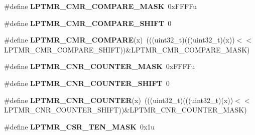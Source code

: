 \begin{DoxyCompactItemize}
\item 
\#define {\bfseries L\+P\+T\+M\+R\+\_\+\+C\+M\+R\+\_\+\+C\+O\+M\+P\+A\+R\+E\+\_\+\+M\+A\+SK}~0x\+F\+F\+F\+Fu\hypertarget{group__LPTMR__Register__Masks_ga55cc95c022500b353f1724f2cbfe7a8f}{}\label{group__LPTMR__Register__Masks_ga55cc95c022500b353f1724f2cbfe7a8f}

\item 
\#define {\bfseries L\+P\+T\+M\+R\+\_\+\+C\+M\+R\+\_\+\+C\+O\+M\+P\+A\+R\+E\+\_\+\+S\+H\+I\+FT}~0\hypertarget{group__LPTMR__Register__Masks_gae1a525e22dc8b9c6960ae2e859a64232}{}\label{group__LPTMR__Register__Masks_gae1a525e22dc8b9c6960ae2e859a64232}

\item 
\#define {\bfseries L\+P\+T\+M\+R\+\_\+\+C\+M\+R\+\_\+\+C\+O\+M\+P\+A\+RE}(x)~(((uint32\+\_\+t)(((uint32\+\_\+t)(x))$<$$<$L\+P\+T\+M\+R\+\_\+\+C\+M\+R\+\_\+\+C\+O\+M\+P\+A\+R\+E\+\_\+\+S\+H\+I\+FT))\&L\+P\+T\+M\+R\+\_\+\+C\+M\+R\+\_\+\+C\+O\+M\+P\+A\+R\+E\+\_\+\+M\+A\+SK)\hypertarget{group__LPTMR__Register__Masks_gad61ee0ea43ca3e503c2c16ed1b7b1696}{}\label{group__LPTMR__Register__Masks_gad61ee0ea43ca3e503c2c16ed1b7b1696}

\item 
\#define {\bfseries L\+P\+T\+M\+R\+\_\+\+C\+N\+R\+\_\+\+C\+O\+U\+N\+T\+E\+R\+\_\+\+M\+A\+SK}~0x\+F\+F\+F\+Fu\hypertarget{group__LPTMR__Register__Masks_ga134708aff0fe3bd31d703e32966c08fc}{}\label{group__LPTMR__Register__Masks_ga134708aff0fe3bd31d703e32966c08fc}

\item 
\#define {\bfseries L\+P\+T\+M\+R\+\_\+\+C\+N\+R\+\_\+\+C\+O\+U\+N\+T\+E\+R\+\_\+\+S\+H\+I\+FT}~0\hypertarget{group__LPTMR__Register__Masks_ga3769a974a3d95250e32bb154fa134c3f}{}\label{group__LPTMR__Register__Masks_ga3769a974a3d95250e32bb154fa134c3f}

\item 
\#define {\bfseries L\+P\+T\+M\+R\+\_\+\+C\+N\+R\+\_\+\+C\+O\+U\+N\+T\+ER}(x)~(((uint32\+\_\+t)(((uint32\+\_\+t)(x))$<$$<$L\+P\+T\+M\+R\+\_\+\+C\+N\+R\+\_\+\+C\+O\+U\+N\+T\+E\+R\+\_\+\+S\+H\+I\+FT))\&L\+P\+T\+M\+R\+\_\+\+C\+N\+R\+\_\+\+C\+O\+U\+N\+T\+E\+R\+\_\+\+M\+A\+SK)\hypertarget{group__LPTMR__Register__Masks_ga8732990b7f3af802120a5e95000c963f}{}\label{group__LPTMR__Register__Masks_ga8732990b7f3af802120a5e95000c963f}

\item 
\#define {\bfseries L\+P\+T\+M\+R\+\_\+\+C\+S\+R\+\_\+\+T\+E\+N\+\_\+\+M\+A\+SK}~0x1u\hypertarget{group__LPTMR__Register__Masks_ga4ed197f1cb8d0e954324b4854ff14a83}{}\label{group__LPTMR__Register__Masks_ga4ed197f1cb8d0e954324b4854ff14a83}


\end{DoxyCompactItemize}

